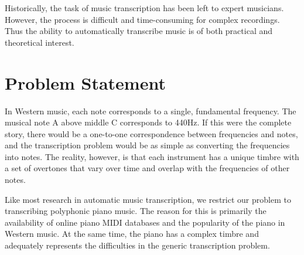 \documentclass[5p]{elsarticle}
\begin{document}
Historically, the task of music transcription has been left to expert musicians.  However, the process is difficult and time-consuming for complex recordings.  Thus the ability to automatically transcribe music is of both practical and theoretical interest.















\section{Problem Statement}

In Western music, each note corresponds to a single, fundamental frequency. The musical note A above middle C corresponds to 440Hz. If this were the complete story, there would be a one-to-one correspondence between frequencies and notes, and the transcription problem would be as simple as converting the frequencies into notes. The reality, however, is that each instrument has a unique timbre with a set of overtones that vary over time and overlap with the frequencies of other notes.

Like most research in automatic music transcription, we restrict our problem to transcribing polyphonic piano music. The reason for this is primarily the availability of online piano MIDI databases and the popularity of the piano in Western music. At the same time, the piano has a complex timbre and adequately represents the difficulties in the generic transcription problem.
\end{document}
